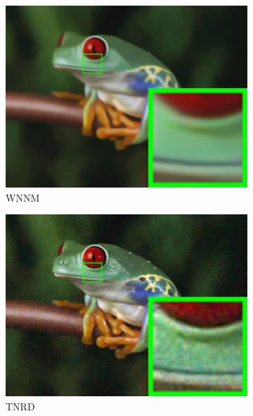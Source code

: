 \begin{figure}
\begin{subfigure}[t]{0.24\textwidth}
        \includegraphics[width=1\textwidth]{images/twsc/nc/resize_br_WNNM_frog.png}
\caption{WNNM}
    \end{subfigure}
    \hfill
    \begin{subfigure}[t]{0.24\textwidth}
        \centering
        \includegraphics[width=1\textwidth]{images/twsc/nc/resize_br_TRD_frog.png}
\caption{TNRD}
    \end{subfigure}
    \hfill
    \begin{subfigure}[t]{0.24\textwidth}
        \centering

\end{subfigure}
\end{figure}
